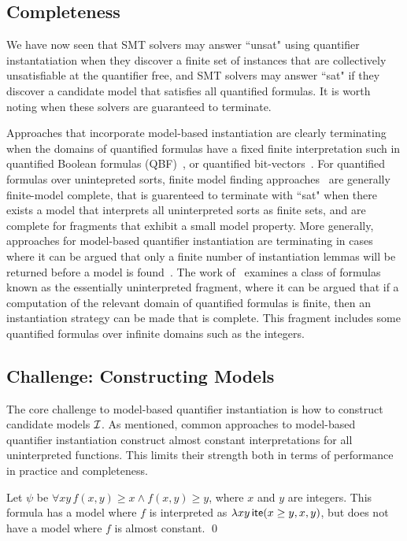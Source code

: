 \documentclass[oribibl]{llncs}
\begin{document}
\subsection{Completeness}
We have now seen that SMT solvers may answer ``unsat" using quantifier instantatiation
when they discover a finite set of instances that are collectively unsatisfiable at the quantifier free,
and SMT solvers may answer ``sat" if they discover a candidate model that satisfies all quantified formulas.
It is worth noting when these solvers are guaranteed to terminate.

Approaches that incorporate model-based instantiation are clearly terminating
when the domains of quantified formulas have a fixed finite interpretation
such in quantified Boolean formulas (QBF)~\cite{janota2012solving},
or quantified bit-vectors~\cite{wintersteiger2013efficiently}.
For quantified formulas over unintepreted sorts,
finite model finding approaches~\cite{ReyEtAl-1-RR-13} are generally finite-model complete,
that is guarenteed to terminate with ``sat" when there exists a model that interprets
all uninterpreted sorts as finite sets, and are complete for fragments
that exhibit a small model property.
More generally, approaches for model-based quantifier instantiation are terminating in cases
where it can be argued that only a finite number of instantiation lemmas will be returned before 
a model is found~\cite{ihlemann2008local,GeDeM-CAV-09}.
The work of~\cite{GeDeM-CAV-09} examines a class of formulas known as the essentially uninterpreted fragment,
where it can be argued that if a computation of the relevant domain of quantified formulas is finite,
then an instantiation strategy can be made that is complete.
This fragment includes some quantified formulas over infinite domains such as the integers.

\subsection{Challenge: Constructing Models}
The core challenge to model-based quantifier instantiation is how to construct candidate models $\mathcal{I}$.
As mentioned, common approaches to model-based quantifier instantiation
construct almost constant interpretations for all uninterpreted functions.
This limits their strength both in terms of performance in practice and completeness.

\begin{example}
Let $\psi$ be $\forall xy\, f( x, y ) \geq x \wedge f( x, y ) \geq y$, where $x$ and $y$ are integers.
This formula has a model where $f$ is interpreted as $\lambda xy\, \mathsf{ite}( x \geq y, x, y )$,
but does not have a model where $f$ is almost constant.
\qed
\end{example}
\end{document}
